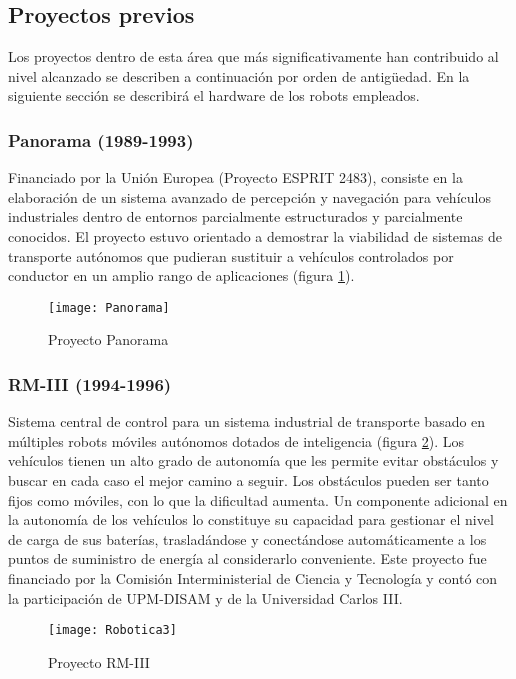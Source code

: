 \subsection{Proyectos previos}
Los proyectos dentro de esta área que más significativamente han contribuido al nivel alcanzado se describen a continuación por orden de antigüedad. En la siguiente sección se describirá el hardware de los robots empleados.

\subsubsection{Panorama (1989-1993)}
Financiado por la Unión Europea (Proyecto ESPRIT 2483), consiste en la elaboración de un sistema avanzado de percepción y navegación para vehículos industriales dentro de entornos parcialmente estructurados y parcialmente conocidos. El proyecto estuvo orientado a demostrar la viabilidad de sistemas de transporte autónomos que pudieran sustituir a vehículos controlados por conductor en un amplio rango de aplicaciones (figura \ref{fg:panorama}).

\begin{figure}[hbt]
  \centering\texttt{[image: Panorama]}\\
  \caption{Proyecto Panorama}\label{fg:panorama}
\end{figure}


\subsubsection{RM-III (1994-1996)}
Sistema central de control para un sistema industrial de transporte basado en múltiples robots móviles autónomos dotados de inteligencia (figura \ref{fg:RM-III}). Los vehículos tienen un alto grado de autonomía que les permite evitar obstáculos y buscar en cada caso el mejor camino a seguir. Los obstáculos pueden ser tanto fijos como móviles, con lo que la dificultad aumenta. Un componente adicional en la autonomía de los vehículos lo constituye su capacidad para gestionar el nivel de carga de sus baterías, trasladándose y conectándose automáticamente a los puntos de suministro de energía al considerarlo conveniente. Este proyecto fue financiado por la Comisión Interministerial de Ciencia y Tecnología y contó con la participación de UPM-DISAM y de la Universidad Carlos III.

\begin{figure}[hbt]
  \centering\texttt{[image: Robotica3]}\\
  \caption{Proyecto RM-III}\label{fg:RM-III}
\end{figure}


